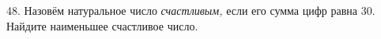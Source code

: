 48. Назовём натуральное число {\it счастливым,} если его сумма цифр равна 30. Найдите наименьшее счастливое число.\\
